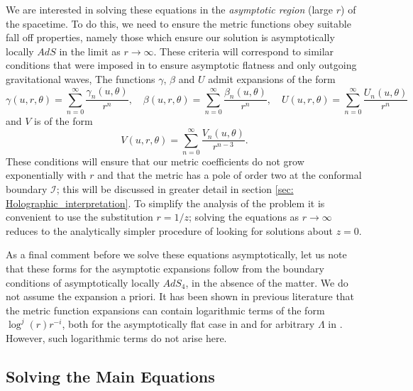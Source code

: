 \documentclass[a4paper,11pt]{article}
\numberwithin{equation}{section}
\begin{document}
We are interested in solving these equations in the \textit{asymptotic region} (large $r$) of the spacetime. To do this, we need to ensure the metric functions obey suitable fall off properties, namely those which ensure our solution is asymptotically locally $AdS$ in the limit as $r \rightarrow \infty$. These criteria will correspond to similar conditions that were imposed in \cite{Bondi:1962px} to ensure asymptotic flatness and only outgoing gravitational waves, The functions $\gamma$, $\beta$ and $U$ admit expansions of the form 
\begin{equation}
\gamma(u,r,\theta)=\sum_{n=0}^{\infty}\frac{\gamma_n(u,\theta)}{r^n}, \quad \beta(u,r,\theta)=\sum_{n=0}^{\infty}\frac{\beta_n(u,\theta)}{r^n}, \quad U(u,r,\theta)=\sum_{n=0}^{\infty}\frac{U_n(u,\theta)}{r^n} 
\end{equation}
and $V$ is of the form 
\begin{equation}
V(u, r, \theta)=\sum_{n=0}^{\infty} \frac {V_n(u, \theta)}{r^{n-3}}.
\end{equation}
These conditions will ensure that our metric coefficients do not grow exponentially with $r$ and that the metric has a pole of order two at the conformal boundary $\mathscr{I}$; this will be discussed in greater detail in section \ref{sec: Holographic_interpretation}.  
To simplify the analysis of the problem it is convenient to use the substitution $r=1/z$; solving the equations as $r \rightarrow \infty$ reduces to the analytically simpler procedure of looking for solutions about $z=0$. 

As a final comment before we solve these equations asymptotically, let us note that these forms for the asymptotic expansions follow from the boundary conditions of asymptotically locally $AdS_4$, in the absence of the matter. We do not assume the expansion a priori.
It has been shown in previous literature that the metric function expansions can contain logarithmic terms of the form $\log^j(r)r^{-i}$, both for the asymptotically flat case in \cite{Andersson:1994ng, 0264-9381-16-5-314} and for arbitrary $\Lambda$ in \cite{Chrusciel:2016oux}. However, such logarithmic terms do not arise here. 

\subsection{Solving the Main Equations}
\end{document}
